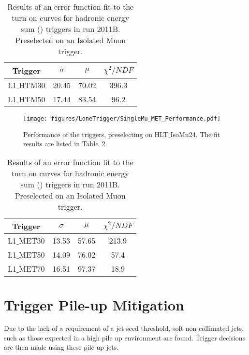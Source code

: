   
\begin{table}[ht]
 \centering
\begin{tabular}{|c|c|c|c|}
\hline
\hline
Trigger & $\sigma$ & $\mu$  & $\chi^2/NDF$\\
\hline
L1$\_$HTM30 & 20.45 & 70.02 & 396.3 \\
\hline
L1$\_$HTM50 & 17.44 & 83.54 & 96.2 \\
\hline
\hline
\end{tabular}
\caption{Results of an error function fit to the turn on curves for \Lone 
hadronic energy sum (\HTm) triggers in run 2011B. Preselected on an Isolated Muon trigger.}
\label{tab:2011B_HTM_performance}
\end{table}

\begin{figure}[ht]
  \centering
    \texttt{[image: figures/LoneTrigger/SingleMu\_MET\_Performance.pdf]}
  \caption{Performance of the \Lone \MET triggers, preselecting on 
  HLT$\_$IsoMu24. The fit results are listed in 
  Table~\ref{tab:2011B_MET_performance}.}
  \label{fig:figures_SingleMu_MET_Performance}
\end{figure}


\begin{table}[ht]
 \centering
\begin{tabular}{|c|c|c|c|}
\hline
\hline
Trigger & $\sigma$ & $\mu$  & $\chi^2/NDF$\\
\hline
L1$\_$MET30 & 13.53 & 57.65 & 213.9\\
\hline
L1$\_$MET50 & 14.09 & 76.02 & 57.4 \\
\hline
L1$\_$MET70 & 16.51 & 97.37 & 18.9 \\
\hline
\hline
\end{tabular}
\caption{Results of an error function fit to the turn on curves for \Lone 
hadronic energy sum (\MET) triggers in run 2011B. Preselected on an Isolated Muon trigger.}
\label{tab:2011B_MET_performance}
\end{table}

\clearpage
\section{\Lone Trigger Pile-up Mitigation} %
\label{sub:lone_trigger_pile_up_mitigation}
Due to the lack of a requirement of a jet seed threshold, soft non-collimated 
jets, such as those expected in a high pile up environment are found. Trigger 
decisions are then made using these pile up jets.

